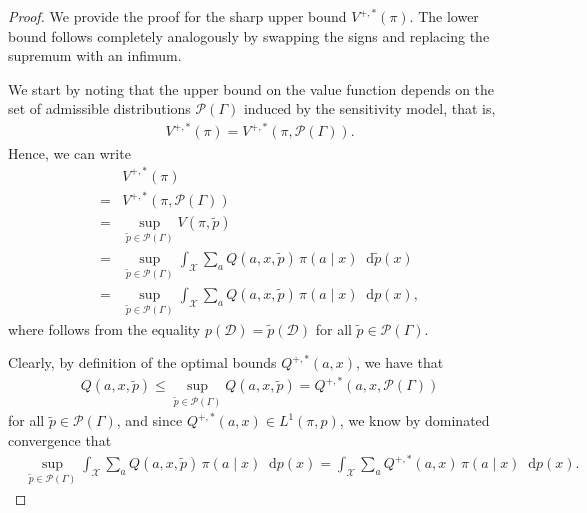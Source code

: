 \documentclass{article} %
\theoremstyle{plain}
\theoremstyle{definition}
\theoremstyle{remark}
\newcommand*\diff{\mathop{}\!\mathrm{d}}
\begin{document}
\begin{proof}
    We provide the proof for the sharp upper bound $V^{+,*}(\pi)$. The lower bound follows completely analogously by swapping the signs and replacing the supremum with an infimum.

    We start by noting that the upper bound on the value function depends on the set of admissible distributions $\mathcal{P}(\Gamma)$ induced by the sensitivity model, that is,
    \begin{align}
        V^{+,*}(\pi) = V^{+,*}(\pi, \mathcal{P}(\Gamma)).
    \end{align}
    Hence, we can write
    \begin{align}
        &V^{+,*}(\pi) \\
        =& V^{+,*}(\pi, \mathcal{P}(\Gamma))\\
        =& \sup_{\tilde{p} \in \mathcal{P}(\Gamma)} V(\pi, \tilde{p})\\
        =& \sup_{\tilde{p} \in \mathcal{P}(\Gamma)}  \int_\mathcal{X} \sum_a  Q(a,x, \tilde{p}) \, \pi(a\mid x)  \diff \tilde{p}(x)\\
        =& \sup_{\tilde{p} \in \mathcal{P}(\Gamma)}  \int_\mathcal{X} \sum_a  Q(a,x, \tilde{p}) \, \pi(a\mid x)  \diff p(x)
        ,\label{eq:equality_marginals1}
    \end{align}
    where  follows from the equality $p(\mathcal{D})=\tilde{p}(\mathcal{D})$ for all $\tilde{p}\in \mathcal{P}(\Gamma)$.
    
    Clearly, by definition of the optimal bounds $Q^{+,*}(a,x)$, we have that
    \begin{align}
        Q(a,x,\tilde{p}) \leq \sup_{\tilde{p}\in\mathcal{P}(\Gamma)} Q(a,x,\tilde{p}) = Q^{+,*}(a,x,\mathcal{P}(\Gamma))
    \end{align}
    for all $\tilde{p}\in\mathcal{P}(\Gamma)$, and since $Q^{+,*}(a,x)\in L^{1}(\pi,p)$, we know by dominated convergence \citep{Frauen.2023c} that
    \begin{align}
        &\sup_{\tilde{p} \in \mathcal{P}(\Gamma)}  \int_\mathcal{X} \sum_a Q(a,x, \tilde{p}) \, \pi(a\mid x) \diff p(x)
        = \int_\mathcal{X} \sum_a Q^{+,*}(a,x) \, \pi(a\mid x) \diff p(x).
    \end{align}
\end{proof}

\clearpage


\end{document}
